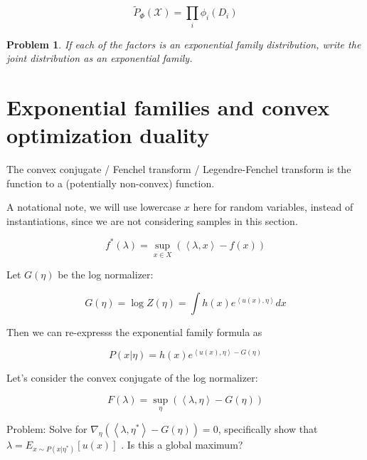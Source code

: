 \documentclass[a4paper]{article}
\newtheorem{problem}{Problem}[section]
\begin{document}
\begin{equation}
  \tilde{P}_\Phi(\mathcal{X}) = \prod_i \phi_i(D_i)
  \label{Gibbs distribution}
\end{equation}

\begin{problem}
  If each of the factors is an exponential family distribution, write the joint distribution as an exponential family.  \\
\end{problem}

\section{Exponential families and convex optimization duality}

The convex conjugate / Fenchel transform / Legendre-Fenchel transform is the function to a (potentially non-convex) function.

A notational note, we will use lowercase $x$ here for random variables, instead of instantiations, since we are not considering samples in this section.

\begin{equation}
  f^*( \lambda ) = \sup_{x \in X} \left( \left< \lambda, x \right> - f(x) \right)
  \label{convex conjugate}
\end{equation}

Let $G(\eta)$ be the log normalizer:

\begin{equation}
  G(\eta) = \log Z(\eta) = \int h(x) e^{ \left< u(x), \eta \right> } dx
  \label{}
\end{equation}

Then we can re-expresss the exponential family formula as

\begin{equation}
  P( x \vert \eta) = h(x) e^{ \left< u(x), \eta \right> - G(\eta) }
  \label{}
\end{equation}

Let's consider the convex conjugate of the log normalizer:

\begin{equation}
  F( \lambda ) = \sup_\eta \left( \left< \lambda, \eta \right> - G(\eta) \right)
  \label{}
\end{equation}

Problem:  
Solve for $ \nabla_\eta \left( \left< \lambda, \eta^* \right> - G(\eta) \right) = 0 $, specifically show that $ \lambda = E_{ x \sim P( x \vert \eta^*) } \left[ u(x) \right] $ .  Is this a global maximum?  
\end{document}
